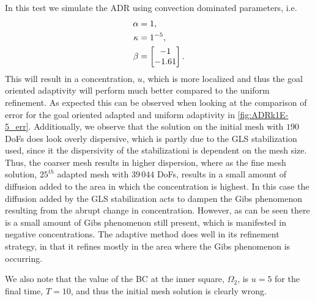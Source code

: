 \begin{test}[Convection Dominated ADR, $\kappa = 1\times10^{-5}$] \label{tst:ADRk1E-5}
    In this test we simulate the ADR using convection dominated parameters, i.e.
    \begin{align*}
        \alpha &= 1, \\
        \kappa &= 1\time 10^{-5}, \\
        \beta &= \begin{bmatrix} -1 \\ -1.61 \end{bmatrix}.
    \end{align*}
    This will result in a concentration, $u$, which is more localized and thus
    the goal oriented adaptivity will perform much better compared to the
    uniform refinement.  As expected this can be observed when looking at the
    comparison of error for the goal oriented adapted and uniform adaptivity in
    \autoref{fig:ADRk1E-5_err}. Additionally, we observe that the solution on
    the initial mesh with $190$ DoFs does look overly dispersive, which is
    partly due to the GLS stabilization used, since it the dispersivity of the
    stabilizationi is dependent on the mesh size. Thus, the coarser mesh results
    in higher dispersion, where as the fine mesh solution, $25^{th}$ adapted
    mesh with $39\, 044$ DoFs, results in a small amount of diffusion added to
    the area in which the concentration is highest. In this case the diffusion
    added by the GLS stabilization acts to dampen the Gibs phenomenon resulting
    from the abrupt change in concentration. However, as can be seen there is a
    small amount of Gibs phenomenon still present, which is manifested in
    negative concentrations. The adaptive method does well in its refinement
    strategy, in that it refines mostly in the area where the Gibs phenomenon
    is occurring.

    We also note that the value of the BC at the inner square, $\Omega_2$, is
    $u = 5$ for the final time, $T=10$, and thus the initial mesh solution is
    clearly wrong.


\end{test}
